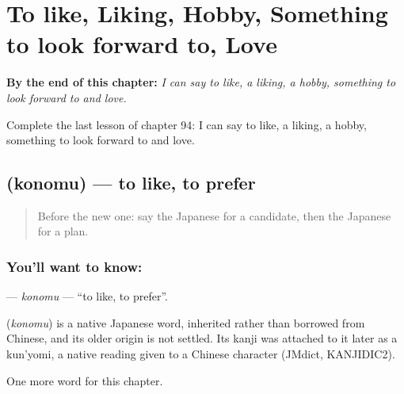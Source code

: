 
\chapter{To like, Liking, Hobby, Something to look forward to, Love}
\label{ch:ja-to-like-liking-hobby-something-to-look-forward-to-love}

\begin{chapteropening}
\textbf{By the end of this chapter:} \emph{I can say to like, a liking, a hobby, something to look forward to and love.}

Complete the last lesson of chapter 94: I can say to like, a liking, a hobby, something to look forward to and love.
\end{chapteropening}

\section[\texorpdfstring{\ja{このむ} (konomu)}{このむ (konomu)}]{ (konomu) — to like, to prefer}

\label{lesson:JA-C94-konomu}



\begin{quote}
Before the new one: say the Japanese for a candidate, then the Japanese for a plan.
\end{quote}

\subsection*{You'll want to know: }
\textbf{} — \emph{konomu} — \textquotedblleft{}to like, to prefer\textquotedblright{}.

\begin{cousinweb}
\textbf{} (\emph{konomu}) is a native Japanese word, inherited rather than borrowed from Chinese, and its older origin is not settled. Its kanji was attached to it later as a kun'yomi, a native reading given to a Chinese character (JMdict, KANJIDIC2).
\end{cousinweb}

\begin{grammarlens}[title={What you've built}]
One more word for this chapter.
\end{grammarlens}


